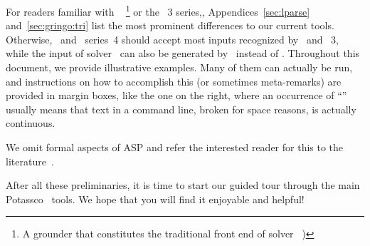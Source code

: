 
For readers familiar with \lparse~\cite{lparseManual}%
\footnote{A grounder that constitutes the traditional front end of solver \smodels~\cite{siniso02a})}
or the \gringo~3 series,,
Appendices~\ref{sec:lparse} and~\ref{sec:gringo:tri}
list the most prominent differences to our current tools.
Otherwise, \gringo\ and \clingo\ series~4 should accept most inputs recognized by \lparse\ and \gringo~3,
while the input of solver \clasp\ can also be generated by \lparse\ instead of \gringo.
Throughout this document, we provide illustrative examples.
Many of them can actually be run, and instructions on how to accomplish this
(or sometimes meta-remarks)
are provided in margin boxes, like the one on the right,%
where an occurrence of ``''
usually means that text in a command line, broken for space reasons, is actually continuous.

We omit formal aspects of ASP and refer the interested reader for this to the literature~\cite{baral02a,gelkah14a,gekakasc12a}.

After all these preliminaries, it is time to start our guided tour
through the main Potassco~\cite{potassco} tools.
We hope that you will find it enjoyable and helpful!

